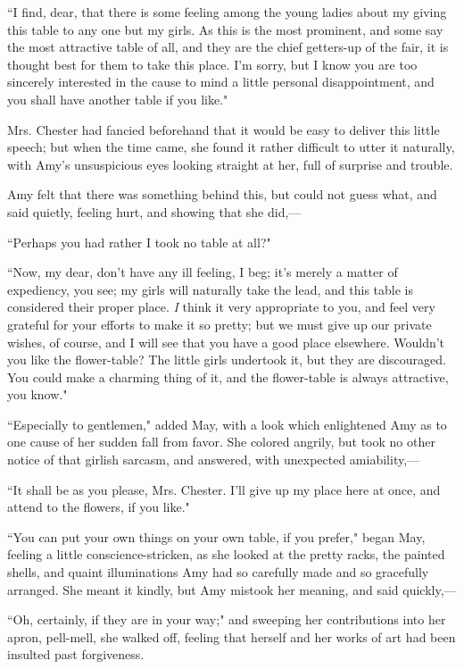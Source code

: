 ``I find, dear, that there is some feeling among the young ladies about
my giving this table to any one but my girls. As this is the most
prominent, and some say the most attractive table of all, and they are
the chief getters-up of the fair, it is thought best for them to take
this place. I'm sorry, but I know you are too sincerely
interested in the cause to mind a little personal disappointment, and
you shall have another table if you like."

Mrs. Chester had fancied beforehand that it would be easy to deliver
this little speech; but when the time came, she found it rather
difficult to utter it naturally, with Amy's unsuspicious
eyes looking straight at her, full of surprise and trouble.

Amy felt that there was something behind this, but could not guess what,
and said quietly, feeling hurt, and showing that she did,---

``Perhaps you had rather I took no table at all?"

``Now, my dear, don't have any ill feeling, I beg;
it's merely a matter of expediency, you see; my girls
will naturally take the lead, and this table is considered their proper
place. \emph{I} think it very appropriate to you, and feel very grateful
for your efforts to make it so pretty; but we must give up our private
wishes, of course, and I will see that you have a good place elsewhere.
Wouldn't you like the flower-table? The little girls
undertook it, but they are discouraged. You could make a charming thing
of it, and the flower-table is always attractive, you know."

``Especially to gentlemen," added May, with a look which enlightened Amy
as to one cause of her sudden fall from favor. She colored angrily, but
took no other notice of that girlish sarcasm, and answered, with
unexpected amiability,---

``It shall be as you please, Mrs. Chester. I'll give up
my place here at once, and attend to the flowers, if you like."

``You can put your own things on your own table, if you prefer," began
May, feeling a little conscience-stricken, as she looked at the pretty
racks, the painted shells, and quaint illuminations Amy had so carefully
made and so gracefully arranged. She meant it kindly, but Amy mistook
her meaning, and said quickly,---

``Oh, certainly, if they are in your way;" and sweeping her contributions
into her apron, pell-mell, she walked off, feeling that herself and her
works of art had been insulted past forgiveness.

